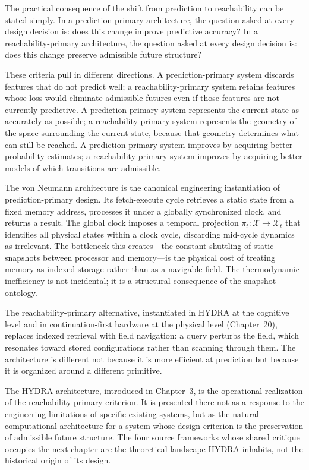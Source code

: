 \documentclass[12pt, oneside]{book}
\theoremstyle{flyxion}
\theoremstyle{definition}
\begin{document}
The practical consequence of the shift from prediction to reachability
can be stated simply. In a prediction-primary architecture, the question
asked at every design decision is: does this change improve predictive
accuracy? In a reachability-primary architecture, the question asked at
every design decision is: does this change preserve admissible future
structure?

These criteria pull in different directions. A prediction-primary
system discards features that do not predict well; a
reachability-primary system retains features whose loss would eliminate
admissible futures even if those features are not currently predictive.
A prediction-primary system represents the current state as accurately
as possible; a reachability-primary system represents the geometry of
the space surrounding the current state, because that geometry
determines what can still be reached. A prediction-primary system
improves by acquiring better probability estimates; a
reachability-primary system improves by acquiring better models of which
transitions are admissible.

The von Neumann architecture is the canonical engineering instantiation
of prediction-primary design. Its fetch-execute cycle retrieves a static
state from a fixed memory address, processes it under a globally
synchronized clock, and returns a result. The global clock imposes a
temporal projection $\pi_t : \mathcal{X} \to \mathcal{X}_t$ that
identifies all physical states within a clock cycle, discarding
mid-cycle dynamics as irrelevant. The bottleneck this creates---the
constant shuttling of static snapshots between processor and memory---is
the physical cost of treating memory as indexed storage rather than as
a navigable field. The thermodynamic inefficiency is not incidental; it
is a structural consequence of the snapshot ontology.

The reachability-primary alternative, instantiated in HYDRA at the
cognitive level and in continuation-first hardware at the physical level
(Chapter~20), replaces indexed retrieval with field navigation: a query
perturbs the field, which resonates toward stored configurations rather
than scanning through them. The architecture is different not because
it is more efficient at prediction but because it is organized around
a different primitive.

The HYDRA architecture, introduced in Chapter~3, is the operational
realization of the reachability-primary criterion. It is presented there
not as a response to the engineering limitations of specific existing
systems, but as the natural computational architecture for a system
whose design criterion is the preservation of admissible future
structure. The four source frameworks whose shared critique occupies
the next chapter are the theoretical landscape HYDRA inhabits, not
the historical origin of its design.
\end{document}

